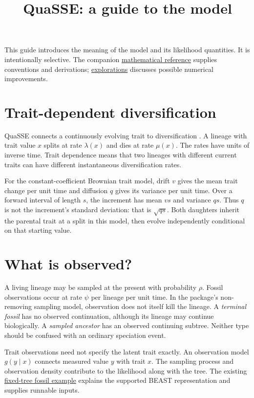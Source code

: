 \documentclass[11pt]{article}
\title{QuaSSE: a guide to the model}
\begin{document}
\maketitle

This guide introduces the meaning of the model and its likelihood quantities. It is intentionally
selective. The companion \href{theory.pdf}{mathematical reference} supplies conventions and derivations; \href{explorations.pdf}{explorations} discusses possible numerical improvements.

\section{Trait-dependent diversification}
QuaSSE connects a continuously evolving trait to diversification \cite{fitzjohn2010}. A lineage
with trait value $x$ splits at rate $\lambda(x)$ and dies at rate $\mu(x)$. The rates have units of
inverse time. Trait dependence means that two lineages with different current traits can have
different instantaneous diversification rates.

For the constant-coefficient Brownian trait model, drift $v$ gives the mean trait change per unit
time and diffusion $q$ gives its variance per unit time. Over a forward interval of length $s$,
the increment has mean $vs$ and variance $qs$. Thus $q$ is not the increment's standard deviation:
that is $\sqrt{qs}$. Both daughters inherit the parental trait at a split in this model, then evolve
independently conditional on that starting value.

\section{What is observed?}
A living lineage may be sampled at the present with probability $\rho$. Fossil observations occur
at rate $\psi$ per lineage per unit time. In the package's non-removing sampling model, observation
does not itself kill the lineage. A \emph{terminal fossil} has no observed continuation, although
its lineage may continue biologically. A \emph{sampled ancestor} has an observed continuing subtree.
Neither type should be confused with an ordinary speciation event.

Trait observations need not specify the latent trait exactly. An observation model $g(y\mid x)$
connects measured value $y$ with trait $x$. The sampling process and observation density contribute
to the likelihood along with the tree. The existing
\href{../../examples/QuaSSE_fossils_fixed_tree.md}{fixed-tree fossil example} explains the supported
BEAST representation and supplies runnable inputs.
\end{document}
